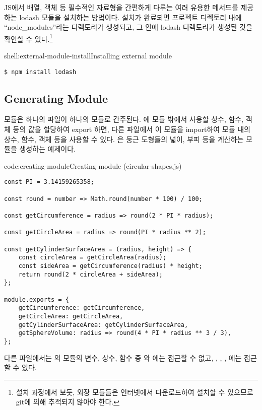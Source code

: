 \은 JS에서 배열, 객체 등 필수적인 자료형을 간편하게 다루는 여러 유용한 메서드를 제공하는 lodash 모듈을 설치하는 방법이다. 설치가 완료되면 프로젝트 디렉토리 내에 ``node\_modules''라는 디렉토리가 생성되고, 그 안에 lodash 디렉토리가 생성된 것을 확인할 수 있다.\footnote{설치 과정에서 보듯, 외장 모듈들은 인터넷에서 다운로드하여 설치할 수 있으므로 git에 의해 추적되지 않아야 한다.}

\begin{shell}{shell:external-module-install}{Installing external module}
\begin{verbatim}
$ npm install lodash
\end{verbatim}
\end{shell}
\clearpage

\subsection*{Generating Module}

모듈은 하나의 파일이 하나의 모듈로 간주된다. 에 모듈 밖에서 사용할 상수, 함수, 객체 등의 값을 할당하여 export 하면, 다른 파일에서 이 모듈을 import하여 모듈 내의 상수, 함수, 객체 등을 사용할 수 있다. 은 둥근 도형들의 넓이, 부피 등을 계산하는 모듈을 생성하는 예제이다.

\begin{code}{code:creating-module}{Creating module (circular-shapes.js)}
\begin{verbatim}
const PI = 3.14159265358;

const round = number => Math.round(number * 100) / 100;

const getCircumference = radius => round(2 * PI * radius);

const getCircleArea = radius => round(PI * radius ** 2);

const getCylinderSurfaceArea = (radius, height) => {
    const circleArea = getCircleArea(radius);
    const sideArea = getCircumference(radius) * height;
    return round(2 * circleArea + sideArea);
};

module.exports = {
    getCircumference: getCircumference,
    getCircleArea: getCircleArea,
    getCylinderSurfaceArea: getCylinderSurfaceArea,
    getSphereVolume: radius => round(4 * PI * radius ** 3 / 3),
};
\end{verbatim}
\end{code}

다른 파일에서는 의 모듈의 변수, 상수, 함수 중 와 에는 접근할 수 없고, , , , 에는 접근할 수 있다.

